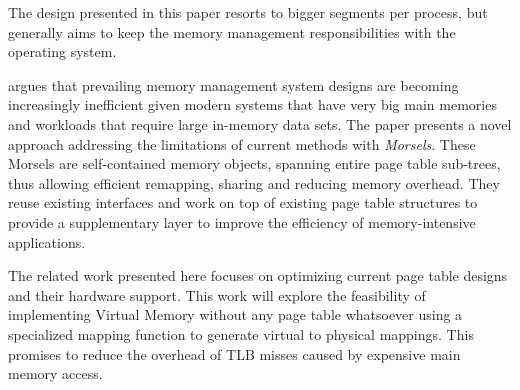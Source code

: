 The design presented in this paper resorts to bigger segments per process, but generally aims to keep the memory management responsibilities with the operating system.


\cite{halbuer2023morsels} argues that prevailing memory management system designs are becoming increasingly inefficient given modern systems that have very big main memories and workloads that require large in-memory data sets.
The paper presents a novel approach addressing the limitations of current methods with \emph{Morsels}.
These Morsels are self-contained memory objects, spanning entire page table sub-trees, thus allowing efficient remapping, sharing and reducing memory overhead.
They reuse existing interfaces and work on top of existing page table structures to provide a supplementary layer to improve the efficiency of memory-intensive applications.


The related work presented here focuses on optimizing current page table designs and their hardware
support. This work will explore the feasibility of implementing Virtual Memory without any page table whatsoever using a specialized mapping function to generate virtual to physical mappings.
This promises to reduce the overhead of TLB misses caused by expensive main memory access.

